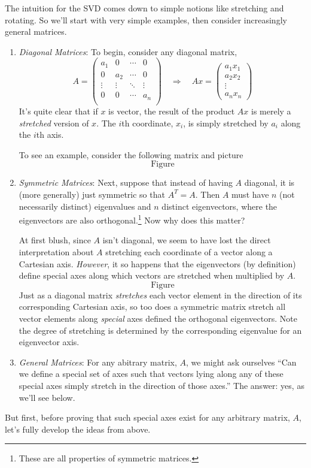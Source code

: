 \documentclass[12pt]{article}
\begin{document}
The intuition for the SVD comes down to simple notions like stretching and rotating. So we'll start with very simple examples, then consider increasingly general matrices.
\begin{enumerate}
\item {\sl Diagonal Matrices}: To begin, consider any diagonal matrix,
\[ 
    A = 
    \begin{pmatrix}
        a_1 & 0 & \cdots & 0 \\
        0 & a_2 & \cdots & 0 \\
        \vdots & \vdots & \ddots & \vdots \\
        0 & 0 & \cdots & a_n \\
    \end{pmatrix}
    \quad 
    \Rightarrow 
    \quad 
    Ax = \begin{pmatrix} a_1 x_1 \\ a_2 x_2 \\ \vdots \\
        a_n x_n \end{pmatrix}
\]
It's quite clear that if $x$ is vector, the result of the product $Ax$ is merely a \emph{stretched} version of $x$. The $i$th coordinate, $x_i$, is simply stretched by $a_i$ along the $i$th axis. 

To see an example, consider the following matrix and picture
\[ \text{Figure} \]

\item {\sl Symmetric Matrices}: Next, suppose that instead of having $A$ diagonal, it is (more generally) just symmetric so that $A^T = A$. Then $A$ must have $n$ (not necessarily distinct) eigenvalues and $n$ distinct eigenvectors, where the eigenvectors are also orthogonal.\footnote{These are all properties of symmetric matrices.} Now why does this matter? 

At first blush, since $A$ isn't diagonal, we seem to have lost the direct interpretation about $A$ stretching each coordinate of a vector along a Cartesian axis. \emph{However}, it so happens that the eigenvectors (by definition) define special axes along which vectors are stretched when multiplied by $A$.  
\[ \text{Figure} \]
Just as a diagonal matrix \emph{stretches} each vector element in the direction of its corresponding Cartesian axis, so too does a symmetric matrix stretch all vector elements along \emph{special} axes defined the orthogonal eigenvectors. Note the degree of stretching is determined by the corresponding eigenvalue for an eigenvector axis. 

\item {\sl General Matrices}: For any abitrary matrix, $A$, we might ask ourselves ``Can we define a special set of axes such that vectors lying along any of these special axes simply stretch in the direction of those axes.'' The answer: yes, as we'll see below.


\end{enumerate}
But first, before proving that such special axes exist for any arbitrary
matrix, $A$, let's fully develop the ideas from above.
\end{document}
